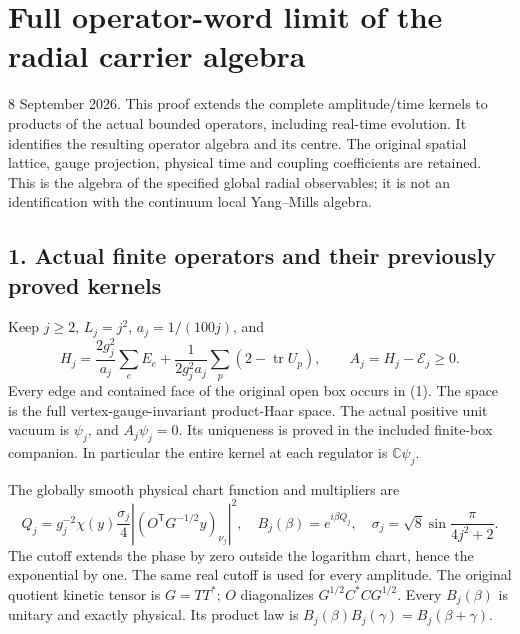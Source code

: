 \documentclass[
  11pt,
]{article}
\begin{document}
\section{Full operator-word limit of the radial carrier
algebra}\label{weak-coupling-part-7-full-operator-word-limit-of-the-radial-carrier-algebra}

8 September 2026. This proof extends the complete amplitude/time kernels
to products of the actual bounded operators, including real-time
evolution. It identifies the resulting operator algebra and its centre.
The original spatial lattice, gauge projection, physical time and
coupling coefficients are retained. This is the algebra of the specified
global radial observables; it is not an identification with the
continuum local Yang--Mills algebra.

\subsection{1. Actual finite operators and their previously proved
kernels}\label{weak-coupling-part-7-actual-finite-operators-and-their-previously-proved-kernels}

Keep \(j\ge2\), \(L_j=j^2\), \(a_j=1/(100j)\), and \[
 H_j=\frac{2g_j^2}{a_j}\sum_eE_e+
 \frac1{2g_j^2a_j}\sum_p(2-\operatorname{tr}U_p),\qquad
 A_j=H_j-\mathcal E_j\ge0 .
 \tag{1}
\] Every edge and contained face of the original open box occurs in (1).
The space is the full vertex-gauge-invariant product-Haar space. The
actual positive unit vacuum is \(\psi_j\), and \(A_j\psi_j=0\). Its
uniqueness is proved in the included finite-box companion. In particular
the entire kernel at each regulator is \(\mathbb C\psi_j\).

The globally smooth physical chart function and multipliers are \[
 Q_j=g_j^{-2}\chi(y)\frac{\sigma_j}{4}
       |(O^{\mathsf T}G^{-1/2}y)_{\nu_j}|^2,\quad
 B_j(\beta)=e^{i\beta Q_j},\quad
 \sigma_j=\sqrt8\sin\frac{\pi}{4j^2+2}.
 \tag{2}
\] The cutoff extends the phase by zero outside the logarithm chart,
hence the exponential by one. The same real cutoff is used for every
amplitude. The original quotient kinetic tensor is \(G=TT^*\); \(O\)
diagonalizes \(G^{1/2}C^*CG^{1/2}\). Every \(B_j(\beta)\) is unitary and
exactly physical. Its product law is
\(B_j(\beta)B_j(\gamma)=B_j(\beta+\gamma)\).
\end{document}
